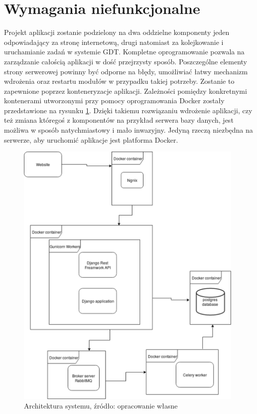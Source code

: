 \section{Wymagania niefunkcjonalne}
Projekt aplikacji zostanie podzielony na dwa oddzielne komponenty jeden odpowiadający za stronę internetową, drugi natomiast za kolejkowanie i uruchamianie zadań w systemie GDT. Kompletne oprogramowanie pozwala na zarządzanie całością aplikacji w dość przejrzysty sposób. Poszczególne elementy strony serwerowej powinny być odporne na błędy, umożliwiać łatwy mechanizm wdrożenia oraz restartu modułów w przypadku takiej potrzeby. Zostanie to zapewnione poprzez konteneryzacje aplikacji. Zależności pomiędzy konkretnymi kontenerami utworzonymi przy pomocy oprogramowania Docker zostały przedstawione na rysunku \ref{rys3_architektura_systemu}. Dzięki takiemu rozwiązaniu wdrożenie aplikacji, czy też zmiana któregoś z komponentów na przykład serwera bazy danych, jest możliwa w sposób natychmiastowy i mało inwazyjny. Jedyną rzeczą niezbędna na serwerze, aby uruchomić aplikacje jest platforma Docker.    

\begin{figure}[htb]
	\centering
	\includegraphics[width=11cm]{grafika/architektura_systemu.eps}
	\caption{Architektura systemu, źródło: opracowanie własne}
	\label{rys3_architektura_systemu}
\end{figure}

